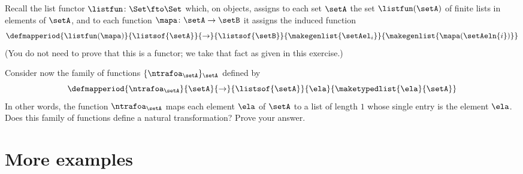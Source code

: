 \begin{gradedexercise}

    Recall the list functor $\listfun \colon \Set \fto \Set$ which, on objects, assigns to each set $\setA$ the set $\listfun(\setA)$ of finite lists in elements of $\setA$, and to each function $\mapa \colon \setA \to \setB$ it assigns the induced function
    \begin{equation}\label{eq:list-functor-on-functions}
        \defmapperiod{
            \listfun(\mapa)
        }{
            \listsof{\setA}
        }{
            \to
        }{
            \listsof{\setB}
        }{
            \makegenlist{ \setAel_i }
        }{
            \makegenlist{ \mapa(\setAeln{i}) }
        }
    \end{equation}
    (You do not need to prove that this is a functor; we take that fact as given in this exercise.)

    Consider now the family of functions $\{ \ntrafoa_\setA \}_\setA$ defined by
    \begin{equation}
        \defmapperiod{
            \ntrafoa_\setA
        }{
            \setA
        }{
            \to
        }{
            \listsof{\setA}
        }{
            \ela
        }{
            \maketypedlist{\ela}{\setA}
        }
    \end{equation}
    In other words, the function $\ntrafoa_\setA$ maps each element $\ela$ of $\setA$ to a list of length $1$ whose single entry is the element $\ela$.
    Does this family of functions define a natural transformation? Prove your answer.
\end{gradedexercise}


\clearpage

\section{More examples}




